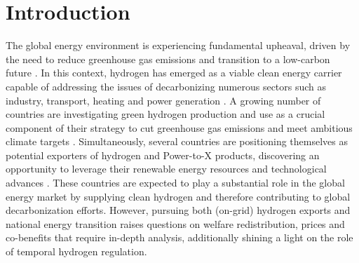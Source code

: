 \documentclass[5p,numafflabel]{elsarticle}
\begin{document}

\onecolumn

\linenumbers


\section*{Introduction}
\label{sec:intro}

The global energy environment is experiencing fundamental upheaval, driven by the need to reduce greenhouse gas emissions and transition to a low-carbon future \cite{Davis2018, Victoria2020}. 
In this context, hydrogen has emerged as a viable clean energy carrier capable of addressing the issues of decarbonizing numerous sectors such as industry, transport, heating and power generation \cite{IEA2021,Ueckerdt2021, Gailani2024, Kovac2021, Azadnia2023}. 
A growing number of countries are investigating green hydrogen production and use as a crucial component of their strategy to cut greenhouse gas emissions and meet ambitious climate targets \cite{IEA2021, Zeyen2023}.
Simultaneously, several countries are positioning themselves as potential exporters of hydrogen and Power-to-X products, discovering an opportunity to leverage their renewable energy resources and technological advances \cite{InternationalEnergyAgency2024}.
These countries are expected to play a substantial role in the global energy market by supplying clean hydrogen and therefore contributing to global decarbonization efforts\cite{InternationalEnergyAgency2024}. However, pursuing both (on-grid) hydrogen exports and national energy transition raises questions on welfare redistribution, prices and co-benefits that require in-depth analysis, additionally shining a light on the role of temporal hydrogen regulation.
\end{document}
